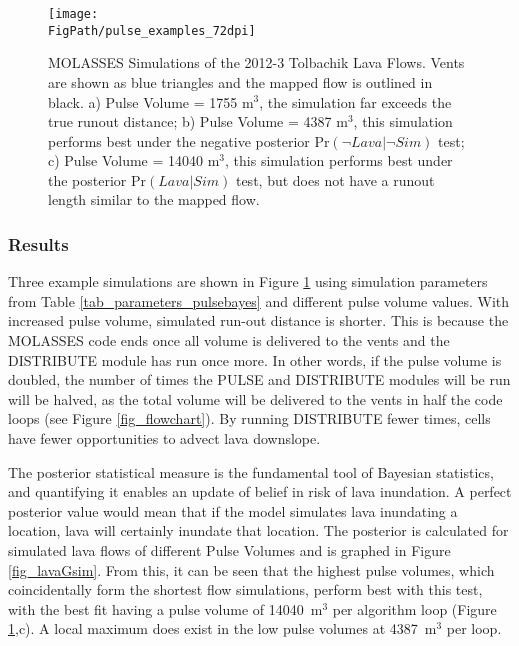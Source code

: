 		\begin{figure}
		\centering
		\texttt{[image: \\FigPath/pulse\_examples\_72dpi]}
		\caption[MOLASSES Simulations with different Pulse Volume parameter values of the 2012-3 Tolbachik Lava Flows]{MOLASSES Simulations of the 2012-3 Tolbachik Lava Flows. Vents are shown as blue triangles and the mapped flow is outlined in black. a) Pulse Volume = 1755 m$^3$, the simulation far exceeds the true runout distance; b) Pulse Volume = 4387 m$^3$, this simulation performs best under the negative posterior $\text{Pr}(\neg Lava|\neg Sim)$ test; c) Pulse Volume = 14040 m$^3$, this simulation performs best under the posterior $\text{Pr}(Lava|Sim)$ test, but does not have a runout length similar to the mapped flow.}
		\label{fig:pulse_map}
		\end{figure}

		\subsubsection{Results}
		
		Three example simulations are shown in Figure \ref{fig:pulse_map} using simulation parameters from Table \ref{tab_parameters_pulsebayes} and different pulse volume values. With increased pulse volume, simulated run-out distance is shorter. This is because the MOLASSES code ends once all volume is delivered to the vents and the DISTRIBUTE module has run once more. In other words, if the pulse volume is doubled, the number of times the PULSE and DISTRIBUTE modules will be run will be halved, as the total volume will be delivered to the vents in half the code loops (see Figure \ref{fig_flowchart}). By running DISTRIBUTE fewer times, cells have fewer opportunities to advect lava downslope.

		The posterior statistical measure is the fundamental tool of Bayesian statistics, and quantifying it enables an update of belief in risk of lava inundation. A perfect posterior value would mean that if the model simulates lava inundating a location, lava will certainly inundate that location. The posterior is calculated for simulated lava flows of different Pulse Volumes and is graphed in Figure \ref{fig_lavaGsim}. From this, it can be seen that the highest pulse volumes, which coincidentally form the shortest flow simulations, perform best with this test, with the best fit having a pulse volume of 14040~m$^3$ per algorithm loop (Figure \ref{fig:pulse_map},c). A local maximum does exist in the low pulse volumes at 4387~m$^3$ per loop.


